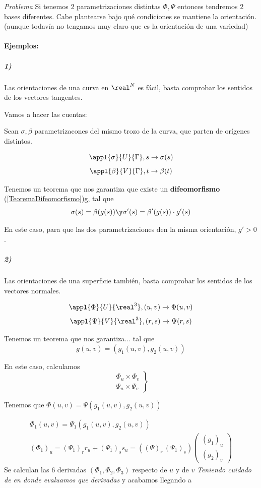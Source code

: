 \textit{Problema} Si tenemos 2 parametrizaciones distintas $\Phi,\Psi$ entonces tendremos 2 bases diferentes. Cabe plantearse bajo qué condiciones se mantiene la orientación. (aunque todavía no tengamos muy claro que es la orientación de una variedad)

\paragraph{Ejemplos:}
\subparagraph{1)} Las orientaciones de una curva en $\real^N$ es fácil, basta comprobar los sentidos de los vectores tangentes. 

Vamos a hacer las cuentas:

Sean $\sigma,\beta$ parametrizacones del mismo trozo de la curva, que parten de orígenes distintos.

\[\appl{\sigma}{U}{\Gamma},s\to \sigma(s)\]
\[\appl{\beta}{V}{\Gamma},t\to \beta(t)\]

Tenemos un teorema que nos garantiza que existe un \textbf{difeomorfismo} (\ref{TeoremaDifeomorfismo})g, tal que \[\sigma(s) = \beta(g(s)) \y \sigma'(s) = \beta'(g(s))\cdot g'(s)\]

En este caso, para que las dos parametrizaciones den la misma orientación, $g'>0$.

\subparagraph{2)} Las orientaciones de una superficie también, basta comprobar los sentidos de los vectores normales.

\[\appl{\Phi}{U}{\real^3}, (u,v) \to \Phi(u,v)\]
\[\appl{\Psi}{V}{\real^3}, (r,s) \to \Psi(r,s)\]

Tenemos un teorema que nos garantiza... tal que \[g(u,v) = (g_1(u,v),g_2(u,v))\]

En este caso, calculamos \[\left.\begin{array}{c}
\Phi_u\times\Phi_v \\
\Psi_u\times\Psi_v
\end{array}\right\}\]

Tenemos que $\Phi(u,v) = \Psi(g_1(u,v),g_2(u,v))$

\begin{gather*}
\Phi_1(u,v) = \Psi_1(g_1(u,v),g_2(u,v))\\
(\Phi_1)_{u} = (\Psi_1)_r r_u + (\Psi_1)_s s_u = ((\Psi)_r\,(\Psi_1)_s)\begin{pmatrix}
(g_1)_u\\(g_2)_v
\end{pmatrix}
\end{gather*}
Se calculan las 6 derivadas $(\Phi_1,\Phi_2,\Phi_3)$ respecto de $u$ y de $v$ \emph{Teniendo cuidado de en donde evaluamos que derivadas} y acabamos llegando a

